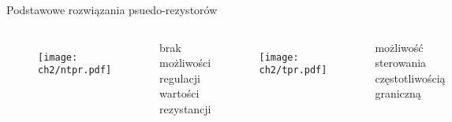 



\begin{frame}{Podstawowe rozwiązania psuedo-rezystorów}
    \begin{columns}

        \begin{figure}[H]
            \texttt{[image: ch2/ntpr.pdf]}
        \end{figure}
        \begin{alertblock}{}
            brak możliwości regulacji wartości rezystancji
        \end{alertblock}



        \begin{figure}[H]
            \texttt{[image: ch2/tpr.pdf]}
        \end{figure}
        \begin{exampleblock}{}
            możliwość sterowania częstotliwością graniczną
        \end{exampleblock}

    \end{columns}
\end{frame}









        



